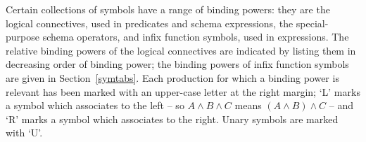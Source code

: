 {{{{{{Certain collections of symbols have a range of binding powers: they
are the logical connectives, used in predicates and schema
expressions, the special-purpose schema operators, and infix function
symbols, used in expressions. The relative binding powers of the
logical connectives are indicated by listing them in decreasing order
of binding power; the binding powers of infix function symbols are
given in Section~\ref{symtabs}. Each production for which a binding
power is relevant has been marked with an upper-case letter at the
right margin; `L' marks a symbol which associates to the left -- so $A
\land B \land C$ means $(A \land B) \land C$ -- and `R' marks a symbol
which associates to the right. Unary symbols are marked with `U'.
\par\vfill\break %
}}}}}}
